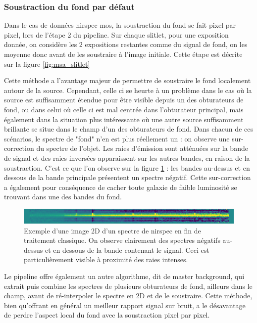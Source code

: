 \documentclass[11pt, a4paper]{article}
\begin{document}
  \subsubsection{Soustraction du fond par défaut}

  Dans le cas de données \gls{nirspec} \gls{mos}, la soustraction du fond se fait pixel par pixel, lors de l'étape 2 du pipeline. Sur chaque slitlet, pour une exposition donnée, on considère les 2 expositions restantes comme du signal de fond, on les moyenne donc avant de les soustraire à l'image initiale. Cette étape est décrite sur la figure \ref{fig:msa_slitlet}

  Cette méthode a l'avantage majeur de permettre de soustraire le fond localement autour de la source. Cependant, celle ci se heurte à un problème dans le cas où la source est suffisamment étendue pour être visible depuis un des obturateurs de fond, ou dans celui où celle ci est mal centrée dans l'obturateur principal, mais également dans la situation plus intéressante où une autre source suffisamment brillante se situe dans le champ d'un des obturateurs de fond. Dans chacun de ces scénarios, le spectre de "fond" n'en est plus réellement un : on observe une sur-correction du spectre de l'objet. Les raies d'émission sont atténuées sur la bande de signal et des raies inversées apparaissent sur les autres bandes, en raison de la soustraction. C'est ce que l'on observe sur la figure \ref{fig:negative_trace} : les bandes au-dessus et en dessous de la bande principale présentent un spectre négatif. Cette sur-correction a également pour conséquence de cacher toute galaxie de faible luminosité se trouvant dans une des bandes du fond.\\
  
  \begin{figure}[H]
    \centering
    \includegraphics[scale=1.1]{assets/negative_trace_nirspec.png}
    \caption{Exemple d'une image 2D d'un spectre de \gls{nirspec} en fin de traitement classique. On observe clairement des spectres négatifs au-dessus et en dessous de la bande contenant le signal. Ceci est particulièrement visible à proximité des raies intenses.}
    \label{fig:negative_trace}
  \end{figure}

  Le pipeline offre également un autre algorithme, dit de master background, qui extrait puis combine les spectres de plusieurs obturateurs de fond, ailleurs dans le champ, avant de ré-interpoler le spectre en 2D et de le soustraire. Cette méthode, bien qu'offrant en général un meilleur rapport signal sur bruit, a le désavantage de perdre l'aspect local du fond avec la soustraction pixel par pixel.
\end{document}
